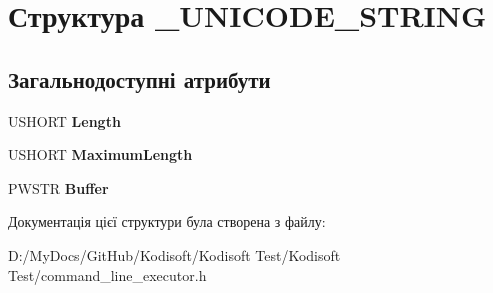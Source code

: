 \hypertarget{struct___u_n_i_c_o_d_e___s_t_r_i_n_g}{\section{Структура \+\_\+\+U\+N\+I\+C\+O\+D\+E\+\_\+\+S\+T\+R\+I\+N\+G}
\label{struct___u_n_i_c_o_d_e___s_t_r_i_n_g}
}
\subsection*{Загальнодоступні атрибути}
\begin{DoxyCompactItemize}
\item 
\hypertarget{struct___u_n_i_c_o_d_e___s_t_r_i_n_g_a3ebb6a85103954fd7fc325ba30c54008}{U\+S\+H\+O\+R\+T {\bfseries Length}}\label{struct___u_n_i_c_o_d_e___s_t_r_i_n_g_a3ebb6a85103954fd7fc325ba30c54008}

\item 
\hypertarget{struct___u_n_i_c_o_d_e___s_t_r_i_n_g_ae0487ecc173e55918bcee834bd3d107b}{U\+S\+H\+O\+R\+T {\bfseries Maximum\+Length}}\label{struct___u_n_i_c_o_d_e___s_t_r_i_n_g_ae0487ecc173e55918bcee834bd3d107b}

\item 
\hypertarget{struct___u_n_i_c_o_d_e___s_t_r_i_n_g_afbc2ba2b7be88d0118e683a2eb289795}{P\+W\+S\+T\+R {\bfseries Buffer}}\label{struct___u_n_i_c_o_d_e___s_t_r_i_n_g_afbc2ba2b7be88d0118e683a2eb289795}

\end{DoxyCompactItemize}


Документація цієї структури була створена з файлу\+:\begin{DoxyCompactItemize}
\item 
D\+:/\+My\+Docs/\+Git\+Hub/\+Kodisoft/\+Kodisoft Test/\+Kodisoft Test/command\+\_\+line\+\_\+executor.\+h\end{DoxyCompactItemize}
